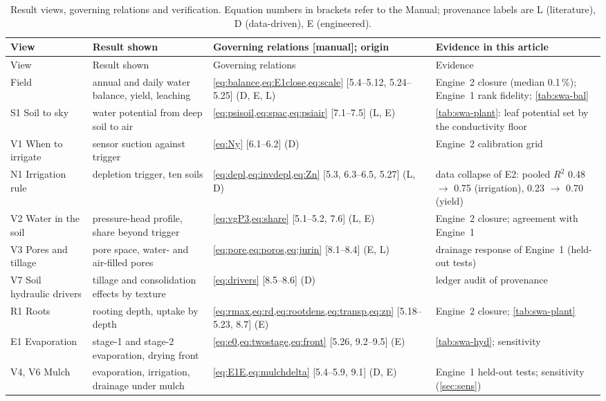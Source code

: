 \documentclass[preprint,12pt]{elsarticle}
\begin{document}
{\small
\begin{longtable}{>{\raggedright\arraybackslash}p{2.3cm}>{\raggedright\arraybackslash}p{3.3cm}>{\raggedright\arraybackslash}p{4.6cm}>{\raggedright\arraybackslash}p{4.0cm}}
\caption{Result views, governing relations and verification. Equation numbers in brackets refer to the Manual; provenance labels are L (literature), D (data-driven), E (engineered).}\label{tab:views}\\
\toprule
View & Result shown & Governing relations [manual]; origin & Evidence in this article\\\midrule\endfirsthead
\toprule View & Result shown & Governing relations & Evidence\\\midrule\endhead
Field & annual and daily water balance, yield, leaching & \cref{eq:balance,eq:E1close,eq:scale} [5.4--5.12, 5.24--5.25] (D, E, L) & Engine~2 closure (median 0.1\,\%); Engine~1 rank fidelity; \cref{tab:swa-bal}\\
S1 Soil to sky & water potential from deep soil to air & \cref{eq:psisoil,eq:spac,eq:psiair} [7.1--7.5] (L, E) & \cref{tab:swa-plant}: leaf potential set by the conductivity floor\\
V1 When to irrigate & sensor suction against trigger & \cref{eq:Ny} [6.1--6.2] (D) & Engine~2 calibration grid\\
N1 Irrigation rule & depletion trigger, ten soils & \cref{eq:depl,eq:invdepl,eq:Zn} [5.3, 6.3--6.5, 5.27] (L, D) & data collapse of E2: pooled $R^2$ 0.48 $\to$ 0.75 (irrigation), 0.23 $\to$ 0.70 (yield)\\
V2 Water in the soil & pressure-head profile, share beyond trigger & \cref{eq:vgP3,eq:share} [5.1--5.2, 7.6] (L, E) & Engine~2 closure; agreement with Engine~1\\
V3 Pores and tillage & pore space, water- and air-filled pores & \cref{eq:pore,eq:poros,eq:jurin} [8.1--8.4] (E, L) & drainage response of Engine~1 (held-out tests)\\
V7 Soil hydraulic drivers & tillage and consolidation effects by texture & \cref{eq:drivers} [8.5--8.6] (D) & ledger audit of provenance\\
R1 Roots & rooting depth, uptake by depth & \cref{eq:rmax,eq:rd,eq:rootdens,eq:transp,eq:zp} [5.18--5.23, 8.7] (E) & Engine~2 closure; \cref{tab:swa-plant}\\
E1 Evaporation & stage-1 and stage-2 evaporation, drying front & \cref{eq:e0,eq:twostage,eq:front} [5.26, 9.2--9.5] (E) & \cref{tab:swa-hyd}; sensitivity\\
V4, V6 Mulch & evaporation, irrigation, drainage under mulch & \cref{eq:E1E,eq:mulchdelta} [5.4--5.9, 9.1] (D, E) & Engine~1 held-out tests; sensitivity (\cref{sec:sens})\\

\end{longtable}}
\end{document}
